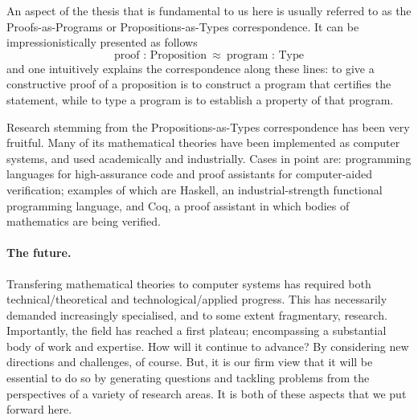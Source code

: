 \documentclass[11pt,twocolumn]{article}
\newenvironment{myitemize}
  {\begin{list}{$\bullet$}
  {\setlength{\topsep}{1pt}
   \setlength{\partopsep}{1pt}
   \setlength{\itemsep}{0pt}
   \setlength{\parsep}{0pt}
   \setlength{\leftmargin}{1em}
   \setlength{\labelwidth}{.5em}}}
  {\end{list}}
\newcommand{\eg}{\emph{eg.}}
\begin{document}
An aspect of the thesis that is fundamental to us here is usually referred
to as the Proofs-as-Programs or Propositions-as-Types correspondence.
It can be impressionistically %
presented %
as follows
\[%
%
  \mbox{proof : Proposition} 
  \enspace \approx \enspace 
  \mbox{program : Type} 
\]
and one intuitively explains the correspondence along these lines: %
  to give a constructive proof of a proposition 
  is to construct a program that certifies the statement, 
  while
  to type a program is to establish a property of that program.

Research stemming from the Propositions-as-Types correspondence has been
very fruitful.  Many of its mathematical theories have been implemented as
computer systems, and used academically and industrially.  Cases in point
are: programming languages for high-assurance code and proof assistants
for computer-aided verification; examples of which are
Haskell, %
an industrial-strength functional programming language, 
and Coq, %
a proof assistant in which bodies of mathematics are being verified.

\paragraph*{The future.}

Transfering mathematical theories to computer
systems has required both technical/theoretical and technological/applied
progress.  This has necessarily demanded increasingly specialised, and to
some extent fragmentary, research.  
Importantly, %
the field has reached a first plateau; encompassing a substantial body of
work and expertise.  
How %
will it continue to advance?  
By considering new directions and challenges, of course.  
But, 
it is our firm view that
it will be essential to do so by generating questions and tackling problems
from the perspectives of a variety of research areas.  
It is both of these aspects that we put forward here.
\end{document}
